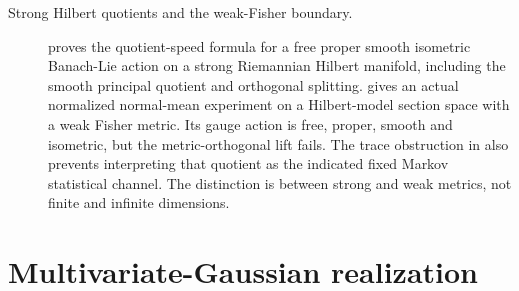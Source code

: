 \begin{description}
\item[Strong Hilbert quotients and the weak-Fisher boundary.]
 proves the quotient-speed formula
for a free proper smooth isometric Banach-Lie action on a strong Riemannian
Hilbert manifold, including the smooth principal quotient and orthogonal
splitting.  gives an actual
normalized normal-mean experiment on a Hilbert-model section space with a
weak Fisher metric. Its gauge action is free, proper, smooth and isometric,
but the metric-orthogonal lift fails. The trace obstruction in
 also prevents interpreting that
quotient as the indicated fixed Markov statistical channel. The distinction
is between strong and weak metrics, not finite and infinite dimensions.
\end{description}

\section{Multivariate-Gaussian realization}

